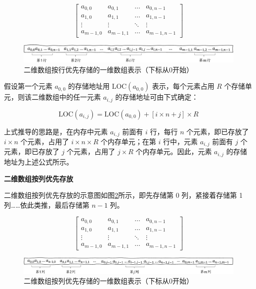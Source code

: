 \documentclass[lang=cn,newtx,10pt,scheme=chinese]{../elegantbook}
\begin{document}
\[
\begin{bmatrix}
a_{0,0} & a_{0,1} & \dots & a_{0,n-1} \\
a_{1,0} & a_{1,1} & \dots & a_{1,n-1} \\
\vdots & \vdots & \ddots & \vdots \\
a_{m-1,0} & a_{m-1,1} & \dots & a_{m-1,n-1}
\end{bmatrix}
\]

\begin{figure}[h]
  \centering
  \includegraphics[width=1\textwidth]{./figure/pdf/cropped/rowFirst.pdf}
  \caption{二维数组按行优先存储的一维数组表示（下标从0开始）}
  \label{fig:row_major_array}
\end{figure}

假设第一个元素 $a_{0,0}$ 的存储地址用 $\text{LOC}(a_{0,0})$ 表示，每个元素占用 $R$ 个存储单元，则该二维数组中的任一元素 $a_{i,j}$ 的存储地址可由下式确定：

\begin{equation}
\text{LOC}(a_{i,j}) = \text{LOC}(a_{0,0}) + [i \times n + j] \times R
\end{equation}

上式推导的思路是，在内存中元素 $a_{i,j}$ 前面有 $i$ 行，每行 $n$ 个元素，即已存放了 $i \times n$ 个元素，占用了 $i \times n \times R$ 个内存单元；在第 $i$ 行中，元素 $a_{i,j}$ 前面有 $j$ 个元素，即已存放了 $j$ 个元素，占用了 $j \times R$ 个内存单元。因此，元素 $a_{i,j}$ 的存储地址为上述公式所示。

\textbf{二维数组按列优先存放}

二维数组按列优先存放的示意图如图\ref{fig:column_major_array}所示，即先存储第 0 列，紧接着存储第 1 列……依此类推，最后存储第 $n-1$ 列。

\[
\begin{bmatrix}
a_{0,0} & a_{0,1} & \dots & a_{0,n-1} \\
a_{1,0} & a_{1,1} & \dots & a_{1,n-1} \\
\vdots & \vdots & \ddots & \vdots \\
a_{m-1,0} & a_{m-1,1} & \dots & a_{m-1,n-1}
\end{bmatrix}
\]

\begin{figure}[h]
  \centering
  \includegraphics[width=1\textwidth]{./figure/pdf/cropped/columnFirst.pdf}
  \caption{二维数组按列优先存储的一维数组表示（下标从0开始）}
  \label{fig:column_major_array}
\end{figure}
\end{document}
